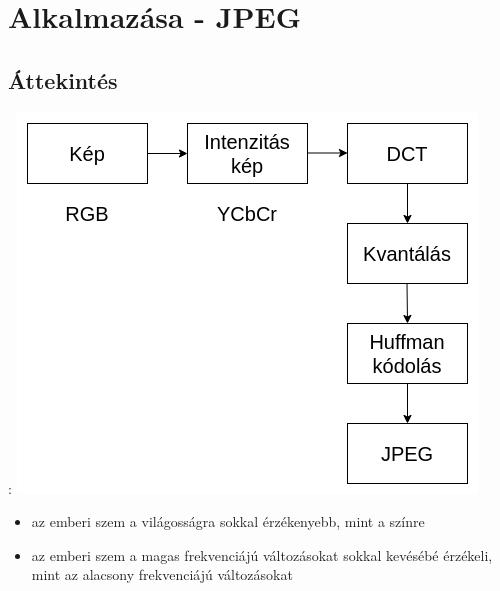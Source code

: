 \documentclass{beamer}
\begin{document}
\section{Alkalmazása - JPEG}

\subsection{Áttekintés}
\begin{frame}{\secname : \subsecname}
\centering
\includegraphics[scale=0.32]{figures/JPEG proc.png}

\begin{itemize}
    \item az emberi szem a világosságra sokkal érzékenyebb, mint a színre
    \item az emberi szem a magas frekvenciájú változásokat sokkal kevésébé érzékeli, mint az alacsony frekvenciájú változásokat
\end{itemize}

\end{frame}
\end{document}

